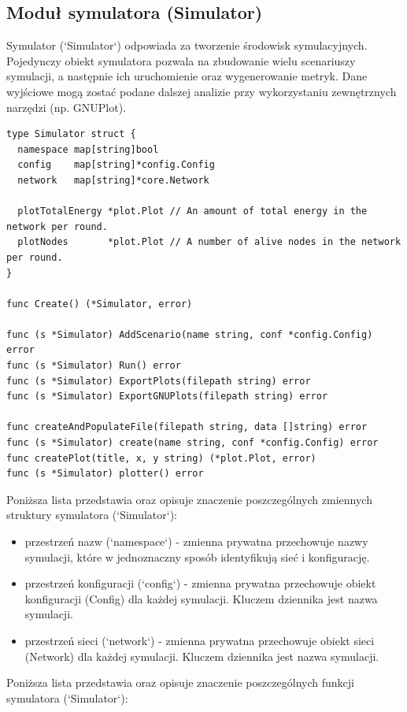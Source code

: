 \documentclass[a4paper,12pt,twoside,openany]{report}
\begin{document}
\subsection{Moduł symulatora (Simulator)}

Symulator (`Simulator`) odpowiada za tworzenie środowisk symulacyjnych.
Pojedynczy obiekt symulatora pozwala na zbudowanie wielu scenariuszy symulacji, a następnie ich uruchomienie oraz
wygenerowanie metryk. Dane wyjściowe mogą zostać podane dalszej analizie przy wykorzystaniu zewnętrznych narzędzi (np. GNUPlot).

\begin{lstlisting}
type Simulator struct {
  namespace map[string]bool
  config    map[string]*config.Config
  network   map[string]*core.Network

  plotTotalEnergy *plot.Plot // An amount of total energy in the network per round.
  plotNodes       *plot.Plot // A number of alive nodes in the network per round.
}

func Create() (*Simulator, error)

func (s *Simulator) AddScenario(name string, conf *config.Config) error
func (s *Simulator) Run() error
func (s *Simulator) ExportPlots(filepath string) error
func (s *Simulator) ExportGNUPlots(filepath string) error

func createAndPopulateFile(filepath string, data []string) error
func (s *Simulator) create(name string, conf *config.Config) error
func createPlot(title, x, y string) (*plot.Plot, error)
func (s *Simulator) plotter() error
\end{lstlisting}

Poniższa lista przedstawia oraz opisuje znaczenie poszczególnych zmiennych struktury symulatora (`Simulator`):

\begin{itemize}
 \item przestrzeń nazw (`namespace`) - zmienna prywatna przechowuje nazwy symulacji, które w jednoznaczny sposób identyfikują sieć i konfigurację.
 \item przestrzeń konfiguracji (`config`) - zmienna prywatna przechowuje obiekt konfiguracji (Config) dla każdej symulacji. Kluczem dziennika jest nazwa symulacji.
 \item przestrzeń sieci (`network`) - zmienna prywatna przechowuje obiekt sieci (Network) dla każdej symulacji. Kluczem dziennika jest nazwa symulacji.
\end{itemize}

Poniższa lista przedstawia oraz opisuje znaczenie poszczególnych funkcji symulatora (`Simulator`):
\end{document}
